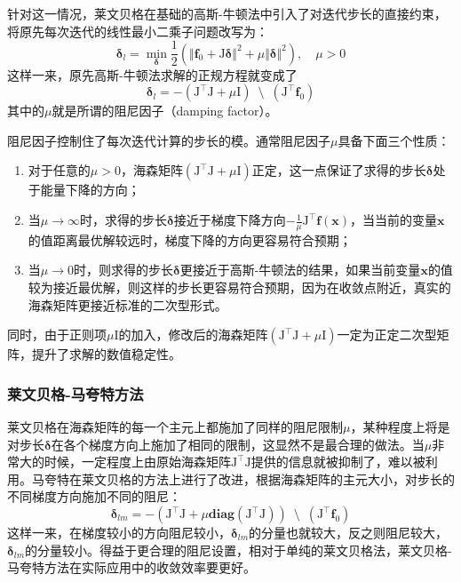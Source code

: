 针对这一情况，莱文贝格在基础的高斯-牛顿法中引入了对迭代步长的直接约束，将原先每次迭代的线性最小二乘子问题改写为：
\begin{equation}
    \bm{\delta}_{l} =
        \mathop{\min}_{\bm{\delta}} \frac{1}{2}
        \left(
            \Vert \mathbf{f}_0 + \mathrm{J}\bm{\delta} \Vert^2 +
            \mu \Vert \bm{\delta} \Vert^2
        \right), \quad \mu > 0
\end{equation}
这样一来，原先高斯-牛顿法求解的正规方程就变成了
\begin{equation}
    \bm{\delta}_l =
        -\left( \mathrm{J}^\top\mathrm{J}+\mu\mathrm{I} \right)
        \enspace\setminus\enspace
        \left( \mathrm{J}^\top\mathbf{f}_0 \right)
    \label{eq:levenberg}
\end{equation}
其中的$\mu$就是所谓的阻尼因子（damping factor）。

阻尼因子控制住了每次迭代计算的步长的模。通常阻尼因子$\mu$具备下面三个性质\citep{tingleff2004methods}：
\begin{enumerate}
    \item 对于任意的$\mu>0$，海森矩阵$(\mathrm{J}^\top\mathrm{J}+\mu\mathrm{I})$正定，这一点保证了求得的步长$\bm{\delta}$处于能量下降的方向；
    \item 当$\mu\to\infty$时，求得的步长$\bm{\delta}$接近于梯度下降方向$-\frac{1}{\mu}\mathrm{J}^\top\mathbf{f}(\bm{x})$，当当前的变量$\bm{x}$ 的值距离最优解较远时，梯度下降的方向更容易符合预期；
    \item 当$\mu\to0$时，则求得的步长$\bm{\delta}$更接近于高斯-牛顿法的结果，如果当前变量$\bm{x}$的值较为接近最优解，则这样的步长更容易符合预期，因为在收敛点附近，真实的海森矩阵更接近标准的二次型形式。
\end{enumerate}
同时，由于正则项$\mu\mathrm{I}$的加入，修改后的海森矩阵$(\mathrm{J}^\top\mathrm{J}+\mu\mathrm{I})$一定为正定二次型矩阵，提升了求解的数值稳定性。

\subsubsection*{莱文贝格-马夸特方法}

莱文贝格在海森矩阵的每一个主元上都施加了同样的阻尼限制$\mu$，某种程度上将是对步长$\bm{\delta}$在各个梯度方向上施加了相同的限制，这显然不是最合理的做法。当$\mu$非常大的时候，一定程度上由原始海森矩阵$\mathrm{J}^\top\mathrm{J}$提供的信息就被抑制了，难以被利用。马夸特在莱文贝格的方法上进行了改进，根据海森矩阵的主元大小，对步长的不同梯度方向施加不同的阻尼：
\begin{equation}
    \bm{\delta}_{lm} =
        -\left( \mathrm{J}^\top\mathrm{J}+\mu\mathbf{diag}(\mathrm{J}^\top\mathrm{J}) \right)
        \enspace\setminus\enspace
        \left( \mathrm{J}^\top \mathbf{f}_0 \right)
\end{equation}
这样一来，在梯度较小的方向阻尼较小，$\bm{\delta}_{lm}$的分量也就较大，反之则阻尼较大，$\bm{\delta}_{lm}$的分量较小。得益于更合理的阻尼设置，相对于单纯的莱文贝格法，莱文贝格-马夸特方法在实际应用中的收敛效率要更好。


